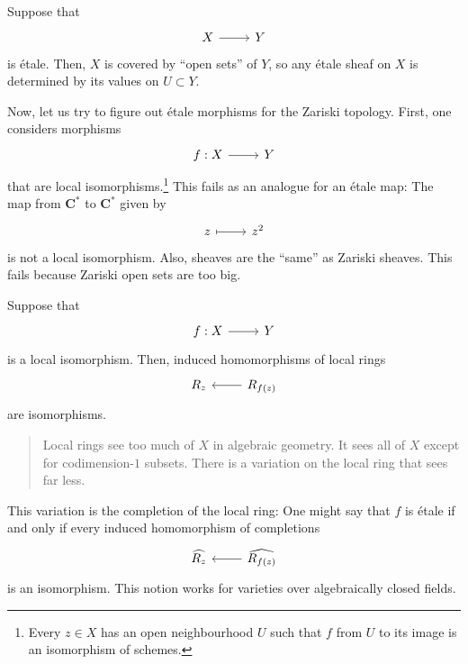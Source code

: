 \documentclass [11 pt, oneside] {article}
\begin{document}
Suppose that
\[
\begin{tikzcd}
	X\ar[r] & Y
\end{tikzcd}
\]
is \'etale. Then, $X$ is covered by ``open sets'' of $Y$, so any \'etale sheaf on $X$ is determined by its values on $U\subset Y$.

Now, let us try to figure out \'etale morphisms for the Zariski topology.
First, one considers morphisms
\[
\begin{tikzcd}
	f:X\ar[r] & Y
\end{tikzcd}
\]
that are local isomorphisms.\footnote{Every $z\in X$ has an open neighbourhood $U$ such that $f$ from $U$ to its image is an isomorphism of schemes.} 
This fails as an analogue for an \'etale map:
The map from $\mathbf{C}^{*}$ to $\mathbf{C}^{*}$ given by
\[
\begin{tikzcd}
	z\ar[r,mapsto] & z^{2}
\end{tikzcd}
\]
is not a local isomorphism.
Also, sheaves are the ``same'' as Zariski sheaves.
This fails because Zariski open sets are too big.

Suppose that 
\[
\begin{tikzcd}
	f:X\ar[r] & Y
\end{tikzcd}
\]
is a local isomorphism. Then, induced homomorphisms of local rings
\[
\begin{tikzcd}
	R_{z}&R_{f(z)}\ar[l]
\end{tikzcd}
\]
are isomorphisms.
\begin{quote}
	\small Local rings see too much of $X$ in algebraic geometry. It sees all of $X$ except for codimension-$1$ subsets. There is a variation on the local ring that sees far less.
\end{quote}
This variation is the completion of the local ring: One might say that $f$ is \'etale if and only if every induced homomorphism of completions
\[
\begin{tikzcd}
	\widehat{R_{z}}& \widehat{R_{f(z)}}\ar[l]
\end{tikzcd}
\]
is an isomorphism.
This notion works for varieties over algebraically closed fields.
\end{document}
